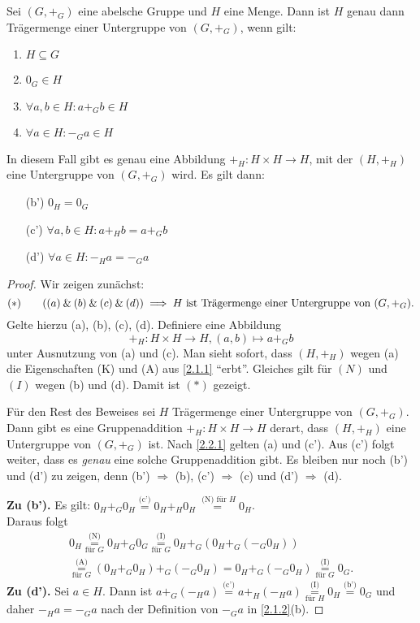 \documentclass[../../main.tex]{subfiles}
\begin{document}
\begin{pro}\label{2.2.2}
Sei $(G,+_G)$ eine abelsche Gruppe und $H$ eine Menge. Dann ist $H$ genau dann Trägermenge einer Untergruppe von $(G,+_G)$, wenn gilt:
\begin{enumerate}[\rm(a)]
\item $H\subseteq G$
\item $0_G \in H$
\item $\forall a,b \in H:a+_G b \in H$
\item $\forall a\in H:-_Ga\in H$
\end{enumerate}
In diesem Fall gibt es genau eine Abbildung $+_H:H\times H\rightarrow H$, mit der $(H,+_H)$ eine Untergruppe von $(G,+_G)$ wird.
Es gilt dann:
\begin{enumerate}
\item[\rm(b')] $0_H = 0_G$
\item[\rm(c')] $\forall a,b\in H:a+_H b = a+_G b$
\item[\rm(d')] $\forall a\in H:-_Ha = -_Ga$
\end{enumerate}
\end{pro}
\begin{proof}
Wir zeigen zunächst:
\[(*)\qquad((a)\mathbin{\&} (b)\mathbin{\&} (c)\mathbin{\&} (d))\implies H\text{ ist Trägermenge einer Untergruppe von $(G,+_G)$.}\]
Gelte hierzu (a), (b), (c), (d). Definiere eine Abbildung
\[+_H:H\times H\rightarrow H, (a,b)\mapsto a+_G b\]
unter Ausnutzung von (a) und (c). Man sieht sofort, dass $(H,+_H)$ wegen (a) die Eigenschaften (K) und (A) aus
\ref{2.1.1} "`erbt"'. Gleiches gilt für $(N)$ und $(I)$ wegen (b) und (d). Damit ist $(*)$ gezeigt.

Für den Rest des Beweises sei $H$ Trägermenge einer Untergruppe von $(G,+_G)$.
Dann gibt es eine Gruppenaddition $+_H:H\times H\rightarrow H$ derart, dass $(H,+_H)$ eine Untergruppe von $(G,+_G)$ ist. Nach \ref{2.2.1} gelten (a) und (c'). Aus (c') folgt weiter, dass es \emph{genau} eine solche Gruppenaddition
gibt. Es bleiben nur noch (b') und (d') zu zeigen, denn (b') $\Longrightarrow$ (b), (c') $\Longrightarrow$ (c)
und (d') $\Longrightarrow$ (d).

\textbf{Zu (b').} Es gilt: $0_H+_G 0_H\overset{\text{(c')}}= 0_H+_H0_H\overset{\text{ (N) für }H}=0_H$.\\
Daraus folgt
\begin{multline*}
0_H\overset{\text{(N)}}{\underset{\text{für }G}=}0_H+_G 0_G
\overset{\text{(I)}}{\underset{\text{für }G}=}0_H+_G(0_H+_G(-_G0_H))\\
\overset{\text{(A)}}{\underset{\text{für }G}=}(0_H+_G0_H)+_G(-_G0_H)= 0_H +_G (-_G0_H)\overset{\text{(I)}}{\underset{\text{für }G}=}0_G.
\end{multline*}
\textbf{Zu (d').} Sei $a\in H$. Dann ist
$a+_G (-_H a) \overset{\text{(c')}}=a +_H (-_Ha)\overset{\text{(I)}}{\underset{\text{für }H}=}0_H
\overset{\text{(b')}}= 0_G$ und daher $-_Ha=-_Ga$ nach der Definition von $-_Ga$ in \ref{2.1.2}(b).
\end{proof}
\end{document}
